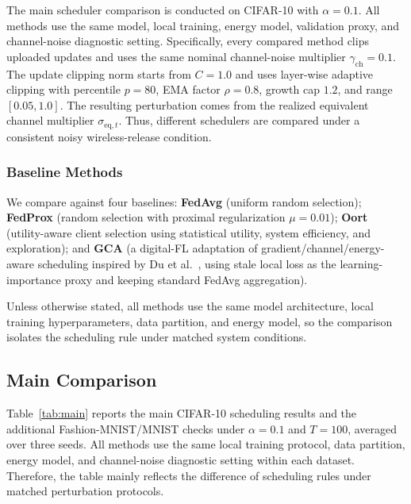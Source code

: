 \documentclass[journal]{IEEEtran}
\begin{document}
The main scheduler comparison is conducted on CIFAR-10 with $\alpha=0.1$. All methods use the same model, local training, energy model, validation proxy, and channel-noise diagnostic setting. Specifically, every compared method clips uploaded updates and uses the same nominal channel-noise multiplier $\gamma_{\mathrm{ch}}=0.1$. The update clipping norm starts from $C=1.0$ and uses layer-wise adaptive clipping with percentile $p=80$, EMA factor $\rho=0.8$, growth cap $1.2$, and range $[0.05,1.0]$. The resulting perturbation comes from the realized equivalent channel multiplier $\sigma_{\mathrm{eq},t}$. Thus, different schedulers are compared under a consistent noisy wireless-release condition.

\subsubsection{Baseline Methods}

We compare against four baselines: \textbf{FedAvg} (uniform random selection); \textbf{FedProx} (random selection with proximal regularization $\mu=0.01$); \textbf{Oort} (utility-aware client selection using statistical utility, system efficiency, and exploration); and \textbf{GCA} (a digital-FL adaptation of gradient/channel/energy-aware scheduling inspired by Du et al.~\cite{du2023gradient}, using stale local loss as the learning-importance proxy and keeping standard FedAvg aggregation).

Unless otherwise stated, all methods use the same model architecture, local training hyperparameters, data partition, and energy model, so the comparison isolates the scheduling rule under matched system conditions.

\label{sec:results}

\subsection{Main Comparison}

Table~\ref{tab:main} reports the main CIFAR-10 scheduling results and the additional Fashion-MNIST/MNIST checks under $\alpha=0.1$ and $T=100$, averaged over three seeds. All methods use the same local training protocol, data partition, energy model, and channel-noise diagnostic setting within each dataset. Therefore, the table mainly reflects the difference of scheduling rules under matched perturbation protocols.
\end{document}
